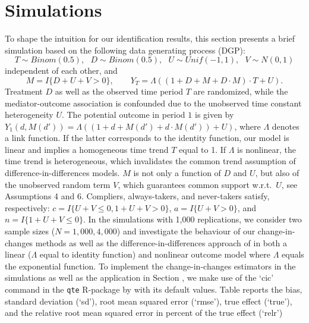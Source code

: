 \documentclass[a4paper,12pt]{article}
\begin{document}
 \doublespacing \pagestyle{plain}
\section{Simulations}
To shape the intuition for our identification results, this section presents a brief simulation based on the following data generating process (DGP):
\begin{equation*}
T \sim Binom(0.5),\textrm{ }D \sim Binom(0.5),\textrm{ }U\sim Unif(-1,1),\textrm{ } V\sim N(0,1)
\end{equation*}
independent of each other, and
\begin{equation*}
M=I\{D+U+V>0\},\qquad Y_T=\Lambda((1+D+M+D\cdot M)\cdot T+U).
\end{equation*}
Treatment $D$ as well as the observed time period $T$ are randomized, while the mediator-outcome association is confounded due to the unobserved time constant heterogeneity $U$. The potential outcome in period $1$ is given by $Y_1(d,M(d'))=\Lambda((1+d+M(d')+d\cdot M(d'))+U)$, where $\Lambda$ denotes a link function. If the latter corresponds to the identity function,  our model is linear and implies a homogeneous time trend $T$ equal to 1. If $\Lambda$ is nonlinear, the time trend is heterogeneous, which invalidates the common trend assumption of difference-in-differences models. $M$ is not only a function of $D$ and $U$, but also of the unobserved random term $V$, which guarantees common support w.r.t.\ $U$, see Assumptions 4 and 6. Compliers, always-takers, and never-takers satisfy, respectively: $c=I\{U+V\leq 0, 1+U+V>0\}$, $a=I\{U+V>0\}$, and $n=I\{1+U+V\leq0\}$.
In the simulations with 1,000 replications, we consider two sample sizes ($N=1,000, 4,000$) and investigate the behaviour of our change-in-changes methods as well as the difference-in-differences approach of  in both a linear ($\Lambda$ equal to identity function) and nonlinear outcome model where $\Lambda$ equals the exponential function. To implement the change-in-changes estimators in the simulations as well as the application in Section , we make use of the `cic' command in the \texttt{qte} R-package by  with its default values.
Table  reports the bias, standard deviation (`sd'), root mean squared error (`rmse'), true effect (`true'), and the relative root mean squared error in percent of the true effect (`relr') 
\end{document}
